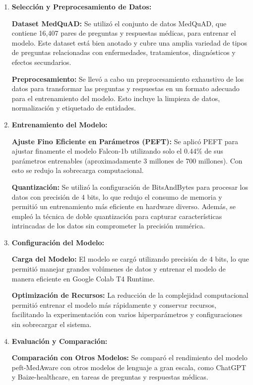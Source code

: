		\begin{enumerate}
			\item \textbf{Selección y Preprocesamiento de Datos:}
			
				\subitem \textbf{Dataset MedQuAD:} Se utilizó el conjunto de datos MedQuAD, que contiene 16,407 pares de preguntas y 	respuestas médicas, para entrenar el modelo. Este dataset está bien anotado y cubre una amplia variedad de tipos de preguntas relacionadas con enfermedades, tratamientos, diagnósticos y efectos secundarios.
				
				\subitem \textbf{Preprocesamiento:} Se llevó a cabo un preprocesamiento exhaustivo de los datos para transformar las 	preguntas y respuestas en un formato adecuado para el entrenamiento del modelo. Esto incluye la limpieza de datos, normalización y etiquetado de entidades.
			
			\item \textbf{Entrenamiento del Modelo:}
			
				\subitem \textbf{Ajuste Fino Eficiente en Parámetros (PEFT):} Se aplicó PEFT para ajustar finamente el modelo Falcon-1b utilizando solo el 0.44\% de sus parámetros entrenables (aproximadamente 3 millones de 700 millones). Con esto se redujo la sobrecarga computacional.
			
				\subitem \textbf{Quantización:} Se utilizó la configuración de BitsAndBytes para procesar los datos con precisión de 4 bits, lo que redujo el consumo de memoria y permitió un entrenamiento más eficiente en hardware diverso. Además, se empleó la técnica de doble quantización para capturar características intrincadas de los datos sin comprometer la precisión numérica.
			
			\item \textbf{Configuración del Modelo:}
			
				\subitem \textbf{Carga del Modelo:} El modelo se cargó utilizando precisión de 4 bits, lo que permitió manejar grandes volúmenes de datos y entrenar el modelo de manera eficiente en Google Colab T4 Runtime.
		
				\subitem \textbf{Optimización de Recursos:} La reducción de la complejidad computacional permitió entrenar el modelo más rápidamente y conservar recursos, facilitando la experimentación con varios hiperparámetros y configuraciones sin sobrecargar el sistema.
			
			\item \textbf{Evaluación y Comparación:}
			
				\subitem \textbf{Comparación con Otros Modelos:} Se comparó el rendimiento del modelo peft-MedAware con otros modelos de lenguaje a gran escala, como ChatGPT y Baize-healthcare, en tareas de preguntas y respuestas médicas. 
		\end{enumerate}
		
